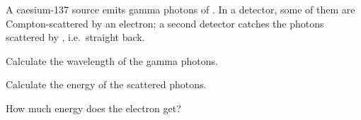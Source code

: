 A caesium-137 source emits gamma photons of \EgO. In a detector, some of them are Compton-scattered by an electron; a second detector catches the photons scattered by \thtO, i.e.\ straight back.

\begin{abcliste}
\abc Calculate the wavelength of the gamma photons.

\abc Calculate the energy of the scattered photons.

\abc How much energy does the electron get?
\end{abcliste}
